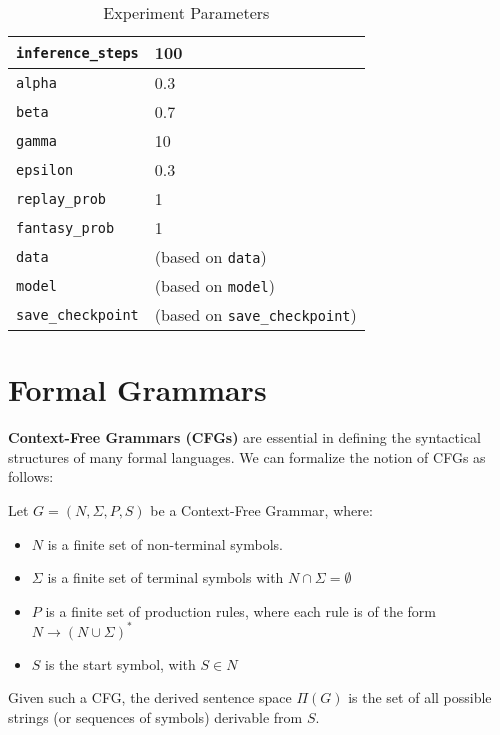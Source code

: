 \begin{table}[H]
\begin{tabular}{|l|l|}
        \hline
        \texttt{inference\_steps} & 100 \\
        \hline
        \texttt{alpha} & 0.3 \\
        \hline
        \texttt{beta} & 0.7 \\
        \hline
        \texttt{gamma} & 10 \\
        \hline
        \texttt{epsilon} & 0.3 \\
        \hline
        \texttt{replay\_prob} & 1 \\
        \hline
        \texttt{fantasy\_prob} & 1 \\
        \hline
        \texttt{data} & (based on \texttt{data}) \\
        \hline
        \texttt{model} & (based on \texttt{model}) \\
        \hline
        \texttt{save\_checkpoint} & (based on \texttt{save\_checkpoint}) \\
        \hline
    \end{tabular}
    \caption{Experiment Parameters}
    \label{}
\end{table}
    

\clearpage
\section{Formal Grammars}\label{app:cfg}

\textbf{Context-Free Grammars (CFGs)} are essential in defining the syntactical structures of many formal languages.
We can formalize the notion of CFGs as follows:

Let \( G = (N, \Sigma, P, S) \) be a Context-Free Grammar, where:

\begin{itemize}
    \item \( N \) is a finite set of non-terminal symbols.
    \item \( \Sigma \) is a finite set of terminal symbols with \newline \( N \cap \Sigma = \emptyset \)
    \item \( P \) is a finite set of production rules, where each rule is of the form \( N \rightarrow (N \cup \Sigma)^* \)
    \item \( S \) is the start symbol, with \( S \in N \)
\end{itemize}

Given such a CFG, the derived sentence space \( \Pi(G) \) is the set of all possible strings (or sequences of symbols) derivable from \( S \).

